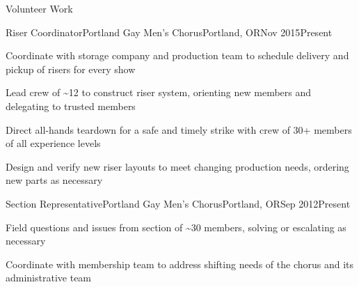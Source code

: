 \documentclass[letterpaper,12pt]{article}
\begin{document}
\begin{paracol}{2}
\begin{res_section}{Volunteer Work}
  \begin{res_experienceitem}{Riser Coordinator}{Portland Gay Men's Chorus}{Portland, OR}{Nov 2015}{Present}
    \item Coordinate with storage company and production team to schedule delivery and pickup of risers for every show
    \item Lead crew of \textasciitilde12 to construct riser system, orienting new members and delegating to trusted members
    \item Direct all-hands teardown for a safe and timely strike with crew of 30+ members of all experience levels
    \item Design and verify new riser layouts to meet changing production needs, ordering new parts as necessary
  \end{res_experienceitem}
  \begin{res_experienceitem}{Section Representative}{Portland Gay Men's Chorus}{Portland, OR}{Sep 2012}{Present}
    \item Field questions and issues from section of \textasciitilde30 members, solving or escalating as necessary
    \item Coordinate with membership team to address shifting needs of the chorus and its administrative team
  \end{res_experienceitem}
\end{res_section}

\flushpage
\end{paracol}
\end{document}
